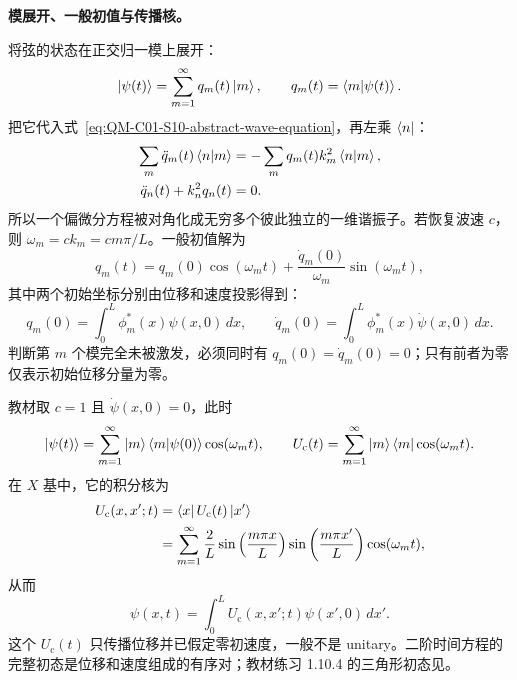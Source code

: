 \begin{checkedsolution}
\textbf{模展开、一般初值与传播核。}

将弦的状态在正交归一模上展开：
\begin{equation}
  \left|\psi(t)\right\rangle=\sum_{m=1}^{\infty}q_m(t)\left|m\right\rangle,
  \qquad
  q_m(t)=\left\langle m \middle| \psi(t) \right\rangle.
  \label{eq:QM-C01-S10-string-mode-expansion}
\end{equation}
把它代入式~\eqref{eq:QM-C01-S10-abstract-wave-equation}，再左乘 $\left\langle n\right|$：
\begin{align}
  \sum_m\ddot q_m(t)\left\langle n \middle| m \right\rangle
  &=-\sum_m q_m(t)k_m^2\left\langle n \middle| m \right\rangle,\\
  \ddot q_n(t)+k_n^2q_n(t)&=0.
  \label{eq:QM-C01-S10-decoupled-string-modes}
\end{align}
所以一个偏微分方程被对角化成无穷多个彼此独立的一维谐振子。若恢复波速 $c$，则 $\omega_m=ck_m=cm\pi/L$。一般初值解为
\begin{equation}
  q_m(t)=q_m(0)\cos(\omega_mt)
  +\frac{\dot q_m(0)}{\omega_m}\sin(\omega_mt),
  \label{eq:QM-C01-S10-general-mode-evolution}
\end{equation}
其中两个初始坐标分别由位移和速度投影得到：
\begin{equation}
  q_m(0)=\int_0^L\phi_m^*(x)\psi(x,0)\,dx,
  \qquad
  \dot q_m(0)=\int_0^L\phi_m^*(x)\dot\psi(x,0)\,dx.
  \label{eq:QM-C01-S10-initial-mode-projections}
\end{equation}
判断第 $m$ 个模完全未被激发，必须同时有 $q_m(0)=\dot q_m(0)=0$；只有前者为零仅表示初始位移分量为零。

教材取 $c=1$ 且 $\dot\psi(x,0)=0$，此时
\begin{equation}
  \left|\psi(t)\right\rangle
  =\sum_{m=1}^{\infty}
    \left|m\right\rangle\left\langle m \middle| \psi(0) \right\rangle\cos(\omega_mt),
  \qquad
  U_{\mathrm c}(t)=\sum_{m=1}^{\infty}
    \left|m\right\rangle\left\langle m\right|\cos(\omega_mt).
  \label{eq:QM-C01-S10-string-propagator}
\end{equation}
在 $X$ 基中，它的积分核为
\begin{align}
  U_{\mathrm c}(x,x';t)
  &=\left\langle x\right|U_{\mathrm c}(t)\left|x'\right\rangle \\
  &=\sum_{m=1}^{\infty}\frac2L
    \sin\left(\frac{m\pi x}{L}\right)
    \sin\left(\frac{m\pi x'}{L}\right)
    \cos(\omega_mt),
  \label{eq:QM-C01-S10-string-propagator-kernel}
\end{align}
从而
\begin{equation}
  \psi(x,t)=\int_0^L
  U_{\mathrm c}(x,x';t)\psi(x',0)\,dx'.
  \label{eq:QM-C01-S10-string-kernel-evolution}
\end{equation}
这个 $U_{\mathrm c}(t)$ 只传播位移并已假定零初速度，一般不是 unitary。二阶时间方程的完整初态是位移和速度组成的有序对；教材练习 1.10.4 的三角形初态见。

\end{checkedsolution}

